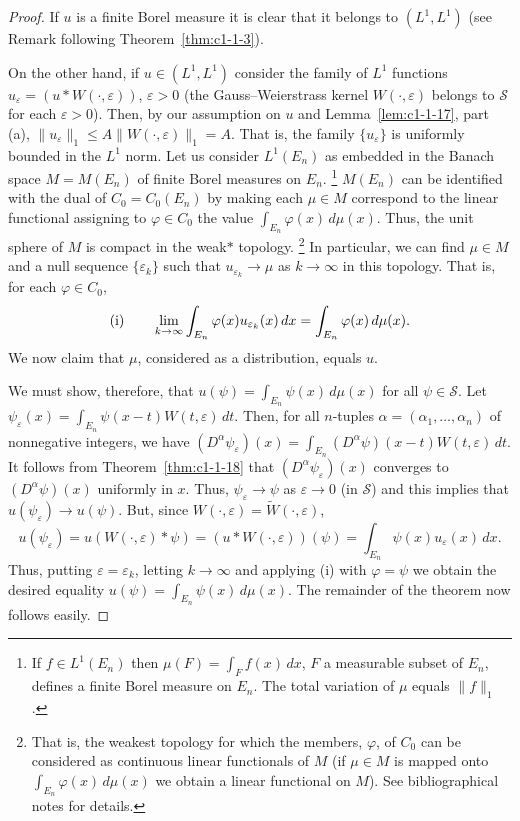 \begin{proof}
If $u$ is a finite Borel measure it is clear that it belongs to
$(L^{1}, L^{1})$ (see Remark following Theorem~\ref{thm:c1-1-3}).

On the other hand, if $u \in (L^{1}, L^{1})$ consider the family of $L^{1}$
functions $u_{\varepsilon} = (u * W(\cdot, \varepsilon))$, $\varepsilon > 0$
(the Gauss--Weierstrass kernel $W(\cdot, \varepsilon)$ belongs to
$\mathscr{S}$ for each $\varepsilon > 0$). Then, by our assumption on $u$ and
Lemma~\ref{lem:c1-1-17}, part (a),
$\|u_{\varepsilon}\|_{1} \leq A\|W(\cdot, \varepsilon)\|_{1} = A$. That is,
the family $\{u_{\varepsilon}\}$ is uniformly bounded in the $L^{1}$ norm. Let
us consider $L^{1}(E_{n})$ as embedded in the Banach space $M = M(E_{n})$ of
finite Borel measures on $E_{n}$.%
\footnote{If $f \in L^{1}(E_{n})$ then $\mu(F) = \int_{F} f(x) \, dx$, $F$ a
measurable subset of $E_{n}$, defines a finite Borel measure on $E_{n}$. The
total variation of $\mu$ equals $\|f\|_{1}$.}
$M(E_{n})$ can be identified with the dual of $C_{0} = C_{0}(E_{n})$ by making
each $\mu \in M$ correspond to the linear functional assigning to
$\varphi \in C_{0}$ the value $\int_{E_{n}} \varphi(x) \, d\mu(x)$. Thus, the
unit sphere of $M$ is compact in the weak$*$ topology.%
\footnote{That is, the weakest topology for which the members, $\varphi$, of
$C_{0}$ can be considered as continuous linear functionals of $M$ (if
$\mu \in M$ is mapped onto $\int_{E_{n}} \varphi(x) \, d\mu(x)$ we obtain a
linear functional on $M$). See bibliographical notes for details.}
In particular, we can find $\mu \in M$ and a null sequence
$\{\varepsilon_{k}\}$ such that $u_{\varepsilon_{k}} \to \mu$ as
$k \to \infty$ in this topology. That is, for each $\varphi \in C_{0}$,
\[
\textup{(i)}\qquad
\lim_{k\to\infty}\int_{E_{n}}\varphi(x)u_{\varepsilon_{k}}(x)\,dx
=\int_{E_{n}}\varphi(x)\,d\mu(x).
\]
We now claim that $\mu$, considered as a distribution, equals $u$.

We must show, therefore, that $u(\psi) = \int_{E_{n}} \psi(x) \, d\mu(x)$ for
all $\psi \in \mathscr{S}$. Let
$\psi_{\varepsilon}(x) = \int_{E_{n}} \psi(x - t)W(t, \varepsilon) \, dt$.
Then, for all $n$-tuples $\alpha = (\alpha_{1}, \ldots, \alpha_{n})$ of
nonnegative integers, we have
$(D^{\alpha}\psi_{\varepsilon})(x) = \int_{E_{n}} (D^{\alpha}\psi)(x - t)W(t, \varepsilon) \, dt$.
It follows from Theorem~\ref{thm:c1-1-18} that $(D^{\alpha}\psi_{\varepsilon})(x)$
converges to $(D^{\alpha}\psi)(x)$ uniformly in $x$. Thus,
$\psi_{\varepsilon} \to \psi$ as $\varepsilon \to 0$ (in $\mathscr{S}$) and
this implies that $u(\psi_{\varepsilon}) \to u(\psi)$. But, since
$W(\cdot, \varepsilon) = \tilde{W}(\cdot, \varepsilon)$,
\[
u(\psi_{\varepsilon})=u(W(\cdot,\varepsilon)*\psi)
=(u*W(\cdot,\varepsilon))(\psi)=\int_{E_{n}}\psi(x)u_{\varepsilon}(x)\,dx.
\]
Thus, putting $\varepsilon = \varepsilon_{k}$, letting $k \to \infty$ and
applying (i) with $\varphi = \psi$ we obtain the desired equality
$u(\psi) = \int_{E_{n}} \psi(x) \, d\mu(x)$. The remainder of the theorem now
follows easily.
\end{proof}


